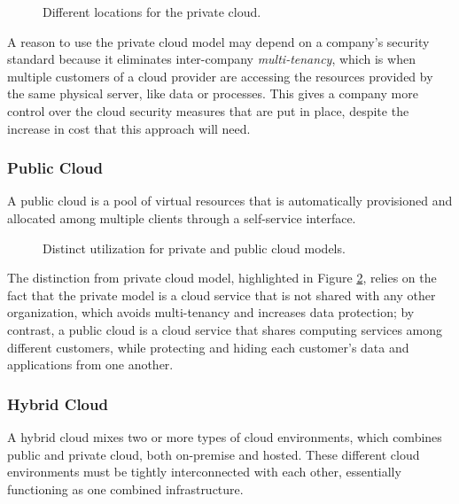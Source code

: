 \begin{figure}[!htb]
    \centering
    
    \caption{Different locations for the private cloud. \cite{private}}
    \label{fig:private_internal_or_hosted}
\end{figure}

A reason to use the private cloud model may depend on a company's security standard because it eliminates inter-company \emph{multi-tenancy}, which is when multiple customers of a cloud provider are accessing the resources provided by the same physical server, like data or processes. This gives a company more control over the cloud security measures that are put in place, despite the increase in cost that this approach will need.

\subsubsection{Public Cloud}
A public cloud is a pool of virtual resources that is automatically provisioned and allocated among multiple clients through a self-service interface.

\begin{figure}[!htb]
    \centering
    
    \caption{Distinct utilization for private and public cloud models. \cite{public}}
    \label{fig:private_vs_public}
\end{figure}

The distinction from private cloud model, highlighted in Figure \ref{fig:private_vs_public}, relies on the fact that the private model is a cloud service that is not shared with any other organization, which avoids multi-tenancy and increases data protection; by contrast, a public cloud is a cloud service that shares computing services among different customers, while protecting and hiding each customer's data and applications from one another.

\pagebreak

\subsubsection{Hybrid Cloud}
A hybrid cloud mixes two or more types of cloud environments, which combines public and private cloud, both on-premise and hosted. These different cloud environments must be tightly interconnected with each other, essentially functioning as one combined infrastructure.

